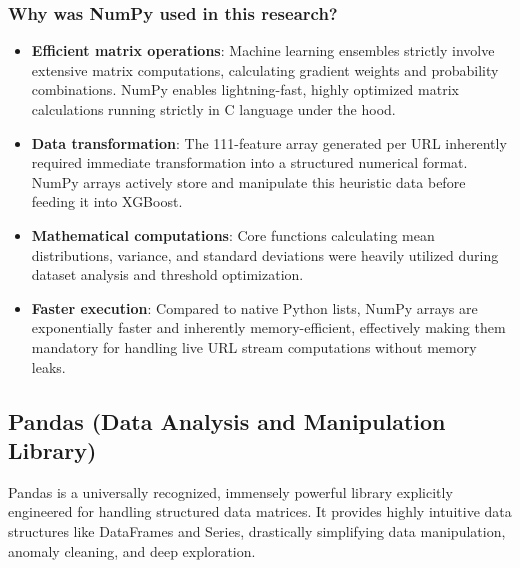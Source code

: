 \subsubsection*{Why was NumPy used in this research?}
\begin{itemize}
\item \textbf{Efficient matrix operations}: Machine learning ensembles strictly involve extensive matrix computations, calculating gradient weights and probability combinations. NumPy enables lightning-fast, highly optimized matrix calculations running strictly in C language under the hood.
\item \textbf{Data transformation}: The 111-feature array generated per URL inherently required immediate transformation into a structured numerical format. NumPy arrays actively store and manipulate this heuristic data before feeding it into XGBoost.
\item \textbf{Mathematical computations}: Core functions calculating mean distributions, variance, and standard deviations were heavily utilized during dataset analysis and threshold optimization.
\item \textbf{Faster execution}: Compared to native Python lists, NumPy arrays are exponentially faster and inherently memory-efficient, effectively making them mandatory for handling live URL stream computations without memory leaks.
\end{itemize}

\subsection{Pandas (Data Analysis and Manipulation Library)}
\noindent
Pandas is a universally recognized, immensely powerful library explicitly engineered for handling structured data matrices. It provides highly intuitive data structures like DataFrames and Series, drastically simplifying data manipulation, anomaly cleaning, and deep exploration.

